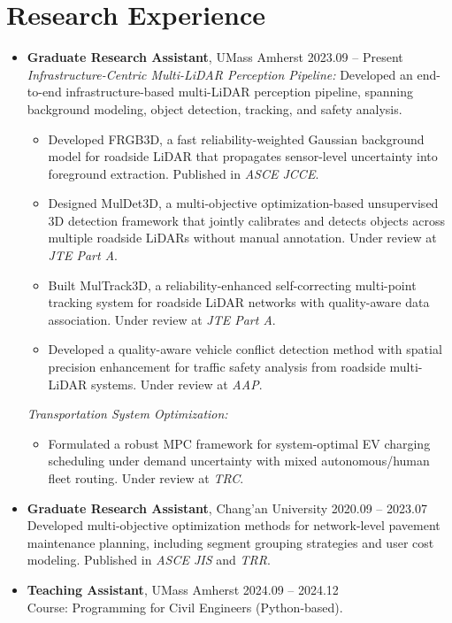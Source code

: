 \documentclass[11pt,a4paper]{article}
\begin{document}
\section*{Research Experience}
\begin{itemize}[leftmargin=1.2em]
    \item \textbf{Graduate Research Assistant}, UMass Amherst \hfill 2023.09 -- Present\\
    \textit{Infrastructure-Centric Multi-LiDAR Perception Pipeline:} Developed an end-to-end infrastructure-based multi-LiDAR perception pipeline, spanning background modeling, object detection, tracking, and safety analysis.
    \begin{itemize}[leftmargin=1em, topsep=1pt]
        \item Developed FRGB3D, a fast reliability-weighted Gaussian background model for roadside LiDAR that propagates sensor-level uncertainty into foreground extraction. Published in \textit{ASCE JCCE}.
        \item Designed MulDet3D, a multi-objective optimization-based unsupervised 3D detection framework that jointly calibrates and detects objects across multiple roadside LiDARs without manual annotation. Under review at \textit{JTE Part A}.
        \item Built MulTrack3D, a reliability-enhanced self-correcting multi-point tracking system for roadside LiDAR networks with quality-aware data association. Under review at \textit{JTE Part A}.
        \item Developed a quality-aware vehicle conflict detection method with spatial precision enhancement for traffic safety analysis from roadside multi-LiDAR systems. Under review at \textit{AAP}.
    \end{itemize}
    \textit{Transportation System Optimization:}
    \begin{itemize}[leftmargin=1em, topsep=1pt]
        \item Formulated a robust MPC framework for system-optimal EV charging scheduling under demand uncertainty with mixed autonomous/human fleet routing. Under review at \textit{TRC}.
    \end{itemize}

    \item \textbf{Graduate Research Assistant}, Chang'an University \hfill 2020.09 -- 2023.07\\
    Developed multi-objective optimization methods for network-level pavement maintenance planning, including segment grouping strategies and user cost modeling. Published in \textit{ASCE JIS} and \textit{TRR}.

    \item \textbf{Teaching Assistant}, UMass Amherst \hfill 2024.09 -- 2024.12\\
    Course: Programming for Civil Engineers (Python-based).
\end{itemize}
\end{document}
